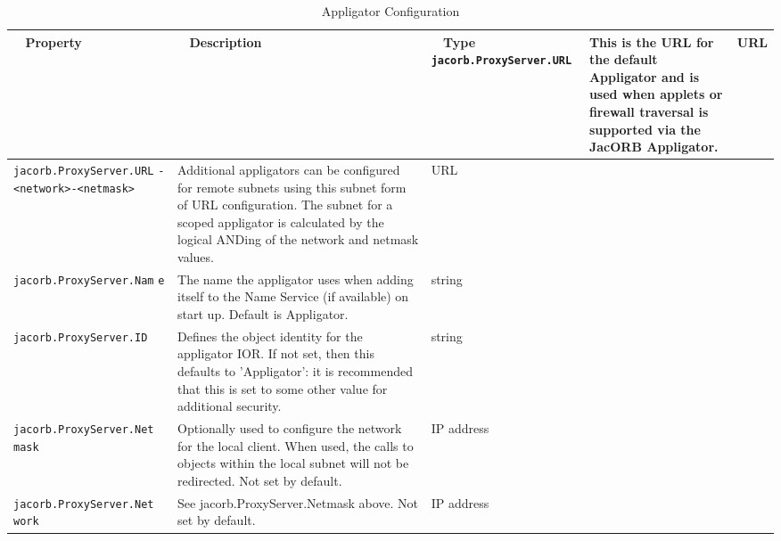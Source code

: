 \begin{small}
\begin{longtable}{|p{5cm}|p{9cm}|p{2cm}|}
\caption{Appligator Configuration}\\
\hline
~ \hfill \textbf {Property} \hfill ~ & ~ \hfill \textbf {Description} \hfill ~ & ~ \hfill \textbf {Type} \hfill ~ \endhead
\hline
\verb"jacorb.ProxyServer.URL" & This is the URL for the default Appligator and is used when applets or firewall traversal is supported via the JacORB Appligator.  & URL \\
\hline
\verb"jacorb.ProxyServer.URL"
\verb"-<network>-<netmask>" & Additional appligators can be configured for remote subnets using this subnet form of URL configuration. The subnet for a scoped appligator is calculated by the logical ANDing of the network and netmask values.  & URL \\
\hline
\verb"jacorb.ProxyServer.Nam"
\verb"e" & The name the appligator uses when adding itself to the Name Service (if available) on start up. Default is Appligator. & string \\
\hline
\verb"jacorb.ProxyServer.ID" & Defines the object identity for the appligator IOR. If not set, then this defaults to 'Appligator': it is recommended that this is set to some other value for additional security. & string \\
\hline
\verb"jacorb.ProxyServer.Net"
\verb"mask" & Optionally used to configure the network for the local client. When used, the calls to objects within the local subnet will not be redirected. Not set by default. & IP address \\
\hline
\verb"jacorb.ProxyServer.Net"
\verb"work" & See jacorb.ProxyServer.Netmask above. Not set by default. & IP address \\
\hline

\end{longtable}
\end{small}



